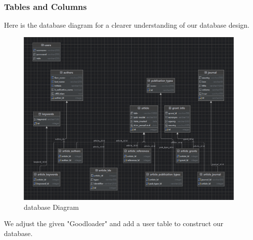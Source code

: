 \documentclass{article}
\begin{document}
\subsubsection{Tables and Columns}
Here is the database diagram for a clearer understanding of our database design.\\
\begin{figure}[h]
\centering %
\includegraphics[width=.8\textwidth]{logic.png} %
\caption{database Diagram} %
\label{fig:引用标签} %
\end{figure}
We adjust the given "Goodloader" and add a user table to construct our database.
\newpage
\end{document}
